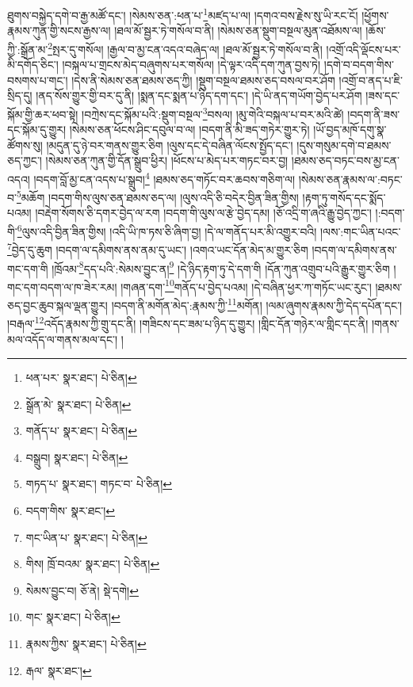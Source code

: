ཐུགས་བསྐྱེད་དགེ་བ་རྒྱ་མཚོ་དང་། །སེམས་ཅན་:ཕན་པ་\footnote{ཕན་པར་  སྣར་ཐང་།  པེ་ཅིན། }མཛད་པ་ལ། །དགའ་བས་རྗེས་སུ་ཡི་རང་ངོ། །ཕྱོགས་རྣམས་ཀུན་གྱི་སངས་རྒྱས་ལ། །ཐལ་མོ་སྦྱར་ཏེ་གསོལ་བ་ནི། །སེམས་ཅན་སྡུག་བསྔལ་མུན་འཐོམས་ལ། །ཆོས་ཀྱི་:སྒྲོན་མ་\footnote{སྒྲོན་མེ་  སྣར་ཐང་།  པེ་ཅིན། }སྤར་དུ་གསོལ། །རྒྱལ་བ་མྱ་ངན་འདའ་བཞེད་ལ། །ཐལ་མོ་སྦྱར་ཏེ་གསོལ་བ་ནི། །འགྲོ་འདི་ལྡོངས་པར་མི་དགོད་ཅིང་། །བསྐལ་པ་གྲངས་མེད་བཞུགས་པར་གསོལ། །དེ་ལྟར་འདི་དག་ཀུན་བྱས་ཏེ། །དགེ་བ་བདག་གིས་བསགས་པ་གང་། །དེས་ནི་སེམས་ཅན་ཐམས་ཅད་ཀྱི། །སྡུག་བསྔལ་ཐམས་ཅད་བསལ་བར་ཤོག །འགྲོ་བ་ནད་པ་ཇི་སྲིད་དུ། །ནད་སོས་གྱུར་གྱི་བར་དུ་ནི། །སྨན་དང་སྨན་པ་ཉིད་དག་དང་། །དེ་ཡི་ནད་གཡོག་བྱེད་པར་ཤོག །ཟས་དང་སྐོམ་གྱི་ཆར་ཕབ་སྟེ། །བཀྲེས་དང་སྐོམ་པའི་:སྡུག་བསྔལ་\footnote{གནོད་པ་  སྣར་ཐང་།  པེ་ཅིན། }བསལ། །མུ་གེའི་བསྐལ་པ་བར་མའི་ཚེ། །བདག་ནི་ཟས་དང་སྐོམ་དུ་གྱུར། །སེམས་ཅན་ཕོངས་ཤིང་དབུལ་བ་ལ། །བདག་ནི་མི་ཟད་གཏེར་གྱུར་ཏེ། །ཡོ་བྱད་མཁོ་དགུ་སྣ་ཚོགས་སུ། །མདུན་དུ་ཉེ་བར་གནས་གྱུར་ཅིག །ལུས་དང་དེ་བཞིན་ལོངས་སྤྱོད་དང་། །དུས་གསུམ་དགེ་བ་ཐམས་ཅད་ཀྱང་། །སེམས་ཅན་ཀུན་གྱི་དོན་སྒྲུབ་ཕྱིར། །ཕོངས་པ་མེད་པར་གཏང་བར་བྱ། །ཐམས་ཅད་བཏང་བས་མྱ་ངན་འདའ། །བདག་བློ་མྱ་ངན་འདས་པ་སྒྲུབ།\footnote{བསྒྲུབ།  སྣར་ཐང་།  པེ་ཅིན། } །ཐམས་ཅད་གཏོང་བར་ཆབས་གཅིག་ལ། །སེམས་ཅན་རྣམས་ལ་:བཏང་བ་\footnote{གཏད་པ་  སྣར་ཐང་། གཏང་བ་  པེ་ཅིན། }མཆོག །བདག་གིས་ལུས་ཅན་ཐམས་ཅད་ལ། །ལུས་འདི་ཅི་བདེར་བྱིན་ཟིན་གྱིས། །རྟག་ཏུ་གསོད་དང་སྨོད་པའམ། །བརྡེག་སོགས་ཅི་དགར་བྱེད་ལ་རག །བདག་གི་ལུས་ལ་རྩེ་བྱེད་དམ། །ཅོ་འདྲི་ག་ཞའི་རྒྱུ་བྱེད་ཀྱང་། །:བདག་གི་\footnote{བདག་གིས་  སྣར་ཐང་། }ལུས་འདི་བྱིན་ཟིན་གྱིས། །འདི་ཡི་ཁ་ཏས་ཅི་ཞིག་བྱ། །དེ་ལ་གནོད་པར་མི་འགྱུར་བའི། །ལས་:གང་ཡིན་པའང་\footnote{གང་ཡིན་པ་  སྣར་ཐང་།  པེ་ཅིན། }བྱེད་དུ་ཆུག །བདག་ལ་དམིགས་ནས་ནམ་དུ་ཡང་། །འགའ་ཡང་དོན་མེད་མ་གྱུར་ཅིག །བདག་ལ་དམིགས་ནས་གང་དག་གི །ཁྲོའམ་\footnote{གིས། ཁྲོ་བའམ་  སྣར་ཐང་།  པེ་ཅིན། }དད་པའི་:སེམས་བྱུང་ན།\footnote{སེམས་བྱུང་བ།  ཅོ་ནེ།  སྡེ་དགེ། } །དེ་ཉིད་རྟག་ཏུ་དེ་དག་གི །དོན་ཀུན་འགྲུབ་པའི་རྒྱུར་གྱུར་ཅིག །གང་དག་བདག་ལ་ཁ་ཟེར་རམ། །གཞན་དག་\footnote{གང་  སྣར་ཐང་།  པེ་ཅིན། }གནོད་པ་བྱེད་པའམ། །དེ་བཞིན་ཕྱར་ཀ་གཏོང་ཡང་རུང་། །ཐམས་ཅད་བྱང་ཆུབ་སྐལ་ལྡན་གྱུར། །བདག་ནི་མགོན་མེད་:རྣམས་ཀྱི་\footnote{རྣམས་ཀྱིས་  སྣར་ཐང་།  པེ་ཅིན། }མགོན། །ལམ་ཞུགས་རྣམས་ཀྱི་དེད་དཔོན་དང་། །བརྒལ་\footnote{རྒལ་  སྣར་ཐང་། }འདོད་རྣམས་ཀྱི་གྲུ་དང་ནི། །གཟིངས་དང་ཟམ་པ་ཉིད་དུ་གྱུར། །གླིང་དོན་གཉེར་ལ་གླིང་དང་ནི། །གནས་མལ་འདོད་ལ་གནས་མལ་དང་། །
